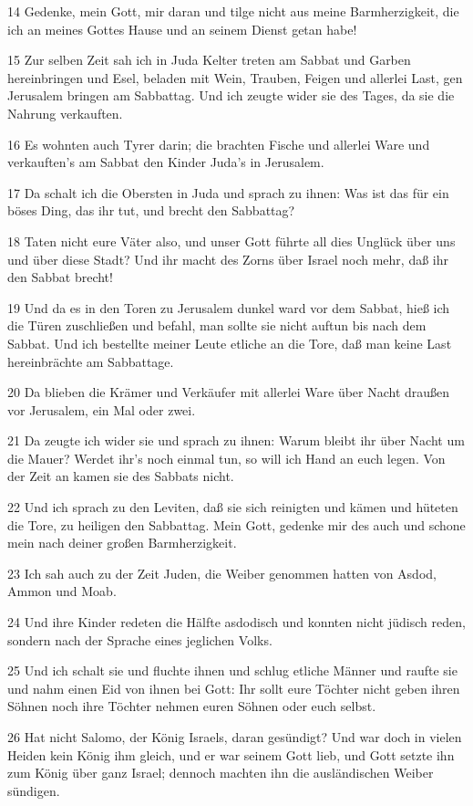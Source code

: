 \par 14 Gedenke, mein Gott, mir daran und tilge nicht aus meine Barmherzigkeit, die ich an meines Gottes Hause und an seinem Dienst getan habe!
\par 15 Zur selben Zeit sah ich in Juda Kelter treten am Sabbat und Garben hereinbringen und Esel, beladen mit Wein, Trauben, Feigen und allerlei Last, gen Jerusalem bringen am Sabbattag. Und ich zeugte wider sie des Tages, da sie die Nahrung verkauften.
\par 16 Es wohnten auch Tyrer darin; die brachten Fische und allerlei Ware und verkauften's am Sabbat den Kinder Juda's in Jerusalem.
\par 17 Da schalt ich die Obersten in Juda und sprach zu ihnen: Was ist das für ein böses Ding, das ihr tut, und brecht den Sabbattag?
\par 18 Taten nicht eure Väter also, und unser Gott führte all dies Unglück über uns und über diese Stadt? Und ihr macht des Zorns über Israel noch mehr, daß ihr den Sabbat brecht!
\par 19 Und da es in den Toren zu Jerusalem dunkel ward vor dem Sabbat, hieß ich die Türen zuschließen und befahl, man sollte sie nicht auftun bis nach dem Sabbat. Und ich bestellte meiner Leute etliche an die Tore, daß man keine Last hereinbrächte am Sabbattage.
\par 20 Da blieben die Krämer und Verkäufer mit allerlei Ware über Nacht draußen vor Jerusalem, ein Mal oder zwei.
\par 21 Da zeugte ich wider sie und sprach zu ihnen: Warum bleibt ihr über Nacht um die Mauer? Werdet ihr's noch einmal tun, so will ich Hand an euch legen. Von der Zeit an kamen sie des Sabbats nicht.
\par 22 Und ich sprach zu den Leviten, daß sie sich reinigten und kämen und hüteten die Tore, zu heiligen den Sabbattag. Mein Gott, gedenke mir des auch und schone mein nach deiner großen Barmherzigkeit.
\par 23 Ich sah auch zu der Zeit Juden, die Weiber genommen hatten von Asdod, Ammon und Moab.
\par 24 Und ihre Kinder redeten die Hälfte asdodisch und konnten nicht jüdisch reden, sondern nach der Sprache eines jeglichen Volks.
\par 25 Und ich schalt sie und fluchte ihnen und schlug etliche Männer und raufte sie und nahm einen Eid von ihnen bei Gott: Ihr sollt eure Töchter nicht geben ihren Söhnen noch ihre Töchter nehmen euren Söhnen oder euch selbst.
\par 26 Hat nicht Salomo, der König Israels, daran gesündigt? Und war doch in vielen Heiden kein König ihm gleich, und er war seinem Gott lieb, und Gott setzte ihn zum König über ganz Israel; dennoch machten ihn die ausländischen Weiber sündigen.
